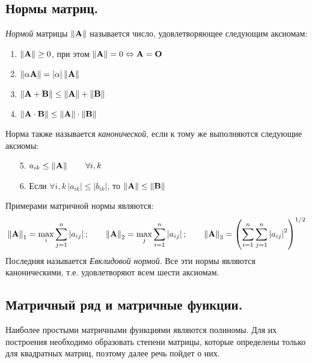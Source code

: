 \documentclass[../../calc-math-exam-2023.tex]{subfiles}
\begin{document}
    \subsection{Нормы матриц.}
    \begin{definition}
        \emph{Нормой} матрицы $\left\| \bf{A} \right\|$ называется число, удовлетворяющее следующим аксиомам:
        \begin{enumerate}
            \item $\displaystyle \left\| \bf{A} \right\| \geq 0$, при этом $\displaystyle \left\| \bf{A} \right\| = 0 \Leftrightarrow \bf{A} = \bf{O}$
            \item $\displaystyle \left\| \alpha \bf{A} \right\| = \left| \alpha \right| \left\| \bf{A} \right\|$
            \item $\left\| \bf{A} + \bf{B} \right\| \leq \left\| \bf{A} \right\| + \left\| \bf{B} \right\|$
            \item $\left\| \bf{A} \cdot \bf{B} \right\| \leq \left\| \bf{A} \right\| \cdot \left\| \bf{B} \right\|$
        \end{enumerate}
    \end{definition}
    Норма также называется \emph{канонической}, если к тому же выполняются следующие аксиомы:
    \begin{enumerate}
        \item[5.] $a_{ik} \leq \left\| \bf{A} \right\| \qquad \forall i, k$
        \item[6.] Если $\forall i, k \, \left| a_{ik} \right| \leq \left| b_{ik} \right|$, то $\left\| \bf{A} \right\| \leq \left\| \bf{B} \right\|$
    \end{enumerate}
    Примерами матричной нормы являются:
    \begin{equation*}
        \left\| \bf{A} \right\|_1 = \max_i \sum_{j=1}^{n} \left| a_{ij} \right|; \qquad \left\| \bf{A} \right\|_2 = \max_j \sum_{i=1}^{n} \left| a_{ij} \right|;
        \qquad \left\| \bf{A} \right\|_3 = \left( \sum_{i=1}^{n} \sum_{j=1}^{n} \left| a_{ij} \right|^2 \right)^{1/2}
    \end{equation*}
    Последняя называется \emph{Евклидовой нормой}. Все эти нормы являются каноническими, т.е. удовлетворяют всем шести аксиомам.

    \subsection{Матричный ряд и матричные функции.}
    Наиболее простыми матричными функциями являются полиномы. Для их построения необходимо образовать степени матрицы,
    которые определены только для квадратных матриц, поэтому далее речь пойдет о них.
\end{document}

